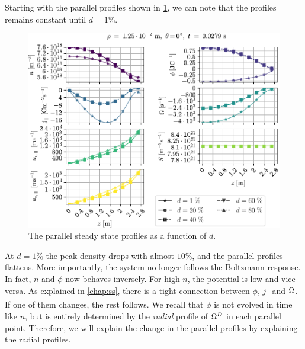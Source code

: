 Starting with the parallel profiles shown in \cref{fig:nnScanPar}, we can note that the profiles remains constant until $d=1\%$.
%
\begin{figure}[htb]
    \centering
    \includegraphics{fig/results/neutral/nnScanPar}
    \caption{The parallel steady state profiles as a function of $d$.}
    \label{fig:nnScanPar}
\end{figure}
%
At $d=1\%$ the peak density drops with almost $10\%$, and the parallel profiles flattens.
More importantly, the system no longer follows the Boltzmann response.
In fact, $n$ and $\phi$ now behaves inversely.
For high $n$, the potential is low and vice versa.
As explained in \cref{chap:ss}, there is a tight connection between $\phi$, $j_\|$ and $\Omega$.
If one of them changes, the rest follows.
We recall that $\phi$ is not evolved in time like $n$, but is entirely determined by the \emph{radial} profile of $\Omega^D$ in each parallel point.
Therefore, we will explain the change in the parallel profiles by explaining the radial profiles.

